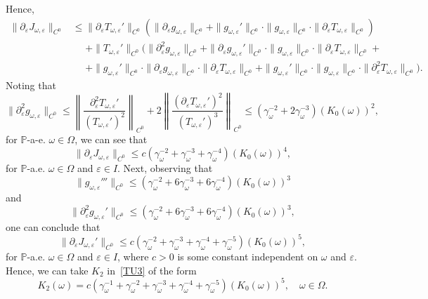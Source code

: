 \documentclass[11pt,reqno,a4paper]{article}
\theoremstyle{special}
\renewcommand{\epsilon}{\varepsilon}
\begin{document}
Hence,
\[
\begin{split}
\|\partial_\epsilon J_{\omega, \epsilon}\|_{C^0} &\le \|\partial_\epsilon T_{\omega, \epsilon}'\|_{C^0} (\| \partial_\epsilon g_{\omega, \epsilon}\|_{C^0}+\|g_{\omega, \epsilon}'\|_{C^0}\cdot \|g_{\omega, \epsilon}\|_{C^0}\cdot \|\partial_\epsilon T_{\omega, \epsilon}\|_{C^0}) \\
&\phantom{\le}+\|T_{\omega, \epsilon}'\|_{C^0}(\|\partial_\epsilon^2 g_{\omega, \epsilon}\|_{C^0}+\| \partial_\epsilon g_{\omega, \epsilon}'\|_{C^0}\cdot \|g_{\omega, \epsilon}\|_{C^0}\cdot \|\partial_\epsilon T_{\omega, \epsilon}\|_{C^0}+\\
&\phantom{\le}+\|g_{\omega, \epsilon}'\|_{C^0}\cdot \|\partial_\epsilon g_{\omega, \epsilon}\|_{C^0}\cdot \|\partial_\epsilon T_{\omega, \epsilon}\|_{C^0}+\|g_{\omega, \epsilon}'\|_{C^0}\cdot \| g_{\omega, \epsilon}\|_{C^0}\cdot \|\partial_\epsilon^2T_{\omega, \epsilon}\|_{C^0} ).
\end{split}
\]
Noting that 
\[
\|\partial_\epsilon^2 g_{\omega, \epsilon}\|_{C^0} \le \left \| \frac{\partial_\epsilon^2 T_{\omega, \epsilon}'}{(T_{\omega, \epsilon}')^2}\right \|_{C^0}+2\left \|\frac{(\partial_\epsilon T_{\omega, \epsilon}')^2}{(T_{\omega, \epsilon}')^3} \right \|_{C^0} \le (\gamma_\omega^{-2}+2\gamma_{\omega}^{-3})(K_0(\omega))^2,
\]
for $\mathbb P$-a-e. $\omega \in \Omega$, we can see that 
\[
\|\partial_\epsilon J_{\omega, \epsilon}\|_{C^0} \le c(\gamma_\omega^{-2}+\gamma_\omega^{-3}+\gamma_{\omega}^{-4})(K_0(\omega))^4,
\]
for $\mathbb P$-a.e. $\omega \in \Omega$ and $\epsilon \in I$. Next, observing that
\[
\|g_{\omega, \epsilon}'''\|_{C^0} \le (\gamma_\omega^{-2}+6\gamma_\omega^{-3}+6\gamma_\omega^{-4})(K_0(\omega))^3
\]
and 
\[
\|\partial_\epsilon^2 g_{\omega, \epsilon}'\|_{C^0}\le (\gamma_\omega^{-2}+6\gamma_\omega^{-3}+6\gamma_\omega^{-4})(K_0(\omega))^3,
\]
one can conclude that 
\[
\| \partial_\epsilon J_{\omega, \epsilon}'\|_{C^0} \le c(\gamma_\omega^{-2}+\gamma_{\omega}^{-3}+\gamma_\omega^{-4}+\gamma_\omega^{-5})(K_0(\omega))^5,
\]
for $\mathbb P$-a.e. $\omega \in \Omega$ and $\epsilon \in I$, where $c>0$ is some constant independent on $\omega$ and $\epsilon$. Hence, we can take $K_2$ in~\eqref{TU3} of the form
\begin{equation}\label{K2 def}
 K_2(\omega)=c(\gamma_\omega^{-1}+\gamma_\omega^{-2}+\gamma_{\omega}^{-3}+\gamma_\omega^{-4}+\gamma_\omega^{-5})(K_0(\omega))^5, \quad \omega \in \Omega.   
\end{equation}
\end{document}
